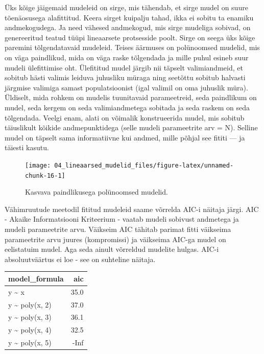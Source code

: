 \documentclass[]{book}
\begin{document}
Üks kõige jäigemaid mudeleid on sirge, mis tähendab, et sirge mudel on suure tõenäosusega alafittitud.
Keera sirget kuipalju tahad, ikka ei sobitu ta enamiku andmekogudega. Ja need vähesed andmekogud, mis sirge mudeliga sobivad, on genereeritud teatud tüüpi lineaarsete protsesside poolt.
Sirge on seega üks kõige paremini tõlgendatavaid mudeleid.
Teises äärmuses on polünoomsed mudelid, mis on väga paindlikud, mida on väga raske tõlgendada ja mille puhul esineb suur mudeli ülefittimise oht.
Ülefititud mudel järgib nii täpselt valimiandmeid, et sobitub hästi valimis leiduva juhusliku müraga ning seetõttu sobitub halvasti järgmise valimiga samast populatsioonist (igal valimil on oma juhuslik müra).
Üldiselt, mida rohkem on mudelis tuunitavaid parameetreid, seda paindlikum on mudel, seda kergem on seda valimiandmetega sobitada ja seda raskem on seda tõlgendada.
Veelgi enam, alati on võimalik konstrueerida mudel, mis sobitub täiuslikult kõikide andmepunktidega (selle mudeli parameetrite arv = N).
Selline mudel on täpselt sama informatiivne kui andmed, mille põhjal see fititi --- ja täiesti kasutu.

\begin{figure}

{\centering \texttt{[image: 04\_lineaarsed\_mudelid\_files/figure-latex/unnamed-chunk-16-1]} 

}

\caption{Kasvava paindlikusega polünoomsed mudelid.}\label{fig:unnamed-chunk-16}
\end{figure}

Vähimruutude meetodil fititud mudeleid saame võrrelda AIC-i näitaja järgi. AIC - Akaike Informatsiooni Kriteerium - vaatab mudeli sobivust andmetega ja mudeli parameetrite arvu.
Väikseim AIC tähitab parimat fitti väikseima parameetrite arvu juures (kompromissi) ja väikseima AIC-ga mudel on eelistatuim mudel. Aga seda ainult võrreldud mudelite hulgas. AIC-i absoluutväärtus ei loe - see on suhteline näitaja.

\begin{tabular}{lr}
\toprule
model\_formula & aic\\
\midrule
y \textasciitilde{} x & 35.0\\
y \textasciitilde{} poly(x, 2) & 37.0\\
y \textasciitilde{} poly(x, 3) & 36.1\\
y \textasciitilde{} poly(x, 4) & 32.5\\
y \textasciitilde{} poly(x, 5) & -Inf\\
\bottomrule
\end{tabular}
\end{document}
